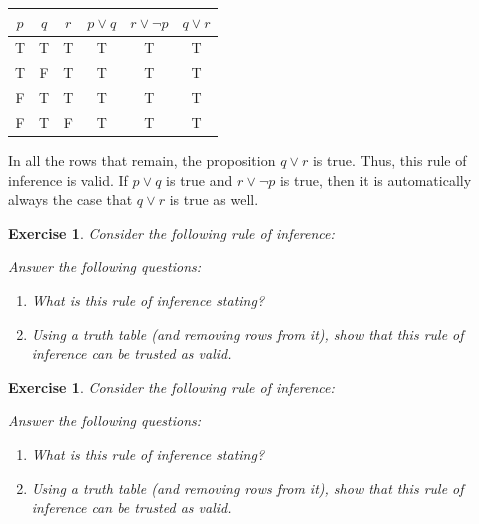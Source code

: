 \documentclass{book}
\newcounter{ekcounter}%
\theoremstyle{ekimcustom}
\newtheorem{exercise}[ekcounter]{Exercise}
\begin{document}
\begin{center}
\begin{tabular}{c|c|c||c|c|c}
$p$ & $q$ & $r$ & $p \vee q$ & $r \vee \neg p$ & $q \vee r$ \\\hline
T & T & T & T& T & T \\
T & F & T & T& T& T \\
F & T & T & T& T& T\\
F & T & F & T& T& T
\end{tabular}
\end{center}
In all the rows that remain, the proposition $q \vee r$ is true. Thus, this rule of inference is valid. If $p \vee q$ is true and $r \vee \neg p$ is true, then it is automatically always the case that $q \vee r$ is true as well.

\begin{exercise}
Consider the following rule of inference:
\begin{center}
\end{center}
Answer the following questions:
\begin{enumerate}
\item What is this rule of inference stating?
\item Using a truth table (and removing rows from it), show that this rule of inference can be trusted as valid.
\end{enumerate}
\end{exercise}

\begin{exercise}
Consider the following rule of inference:
\begin{center}
\end{center}
Answer the following questions:
\begin{enumerate}
\item What is this rule of inference stating?
\item Using a truth table (and removing rows from it), show that this rule of inference can be trusted as valid.
\end{enumerate}
\end{exercise}
\end{document}
